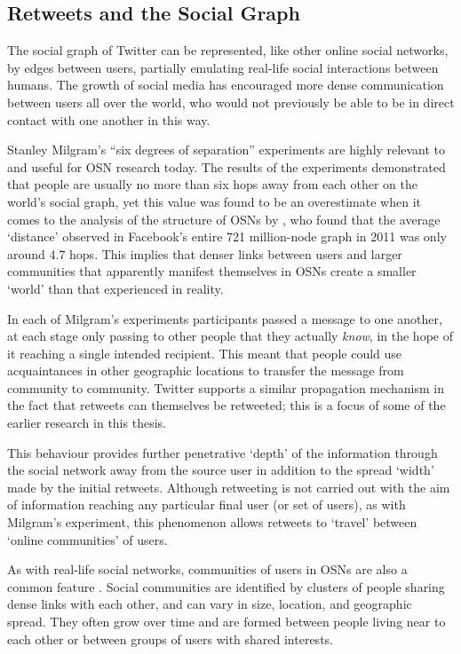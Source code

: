 \subsection{Retweets and the Social Graph}
The social graph of Twitter can be represented, like other online social networks, by edges between users, partially emulating real-life social interactions between humans. The growth of social media has encouraged more dense communication between users all over the world, who would not previously be able to be in direct contact with one another in this way.

Stanley Milgram's ``six degrees of separation'' \cite{milgram67} experiments are highly relevant to and useful for OSN research today. The results of the experiments demonstrated that people are usually no more than six hops away from each other on the world's social graph, yet this value was found to be an overestimate when it comes to the analysis of the structure of OSNs by \citet{backstrom11}, who found that the average `distance' observed in Facebook's entire 721 million-node graph in 2011 was only around 4.7 hops. This implies that denser links between users and larger communities that apparently manifest themselves in OSNs create a smaller `world' than that experienced in reality.

In each of Milgram's experiments participants passed a message to one another, at each stage only passing to other people that they actually \textit{know}, in the hope of it reaching a single intended recipient. This meant that people could use acquaintances in other geographic locations to transfer the message from community to community. Twitter supports a similar propagation mechanism in the fact that retweets can themselves be retweeted; this is a focus of some of the earlier research in this thesis.

This behaviour provides further penetrative `depth' of the information through the social network away from the source user in addition to the spread `width' made by the initial retweets. Although retweeting is not carried out with the aim of information reaching any particular final user (or set of users), as with Milgram's experiment, this phenomenon allows retweets to `travel' between `online communities' of users.

As with real-life social networks, communities of users in OSNs are also a common feature \cite{ugander11}. Social communities are identified by clusters of people sharing dense links with each other, and can vary in size, location, and geographic spread. They often grow over time and are formed between people living near to each other or between groups of users with shared interests.


